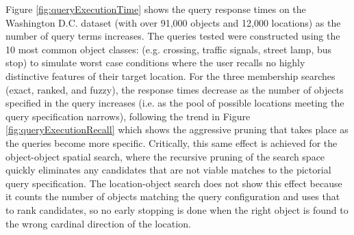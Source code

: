 Figure \ref{fig:queryExecutionTime} shows the query response times on the Washington D.C. dataset (with over 91,000 objects and 12,000 locations) as the number of query terms increases. 
The queries tested were constructed using the 10 most common object classes: (e.g. crossing, traffic signals, street lamp, bus stop) to simulate worst case conditions where the user recalls no highly distinctive features of their target location.
For the three membership searches (exact, ranked, and fuzzy), the response times decrease as the number of objects specified in the query increases (i.e. as the pool of possible locations meeting the query specification narrows), following the trend in Figure \ref{fig:queryExecutionRecall} which shows the aggressive pruning that takes place as the queries become more specific.
Critically, this same effect is achieved for the object-object spatial search, where the recursive pruning of the search space quickly eliminates any candidates that are not viable matches to the pictorial query specification.
The location-object search does not show this effect because it counts the number of objects matching the query configuration and uses that to rank candidates, so no early stopping is done when the right object is found to the wrong cardinal direction of the location. %









